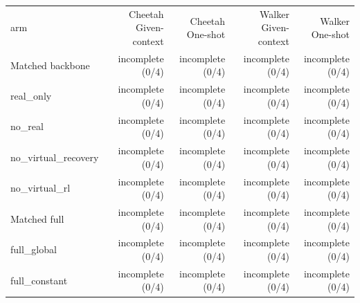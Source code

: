 \begin{tabular}{lrrrr}
arm & Cheetah Given-context & Cheetah One-shot & Walker Given-context & Walker One-shot \\
Matched backbone & incomplete (0/4) & incomplete (0/4) & incomplete (0/4) & incomplete (0/4) \\
real\_only & incomplete (0/4) & incomplete (0/4) & incomplete (0/4) & incomplete (0/4) \\
no\_real & incomplete (0/4) & incomplete (0/4) & incomplete (0/4) & incomplete (0/4) \\
no\_virtual\_recovery & incomplete (0/4) & incomplete (0/4) & incomplete (0/4) & incomplete (0/4) \\
no\_virtual\_rl & incomplete (0/4) & incomplete (0/4) & incomplete (0/4) & incomplete (0/4) \\
Matched full & incomplete (0/4) & incomplete (0/4) & incomplete (0/4) & incomplete (0/4) \\
full\_global & incomplete (0/4) & incomplete (0/4) & incomplete (0/4) & incomplete (0/4) \\
full\_constant & incomplete (0/4) & incomplete (0/4) & incomplete (0/4) & incomplete (0/4) \\
\end{tabular}
